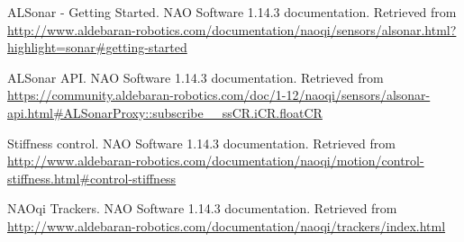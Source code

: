 \begin{thebibliography}{99}
	ALSonar - Getting Started.
	NAO Software 1.14.3 documentation.
	Retrieved from \url{http://www.aldebaran-robotics.com/documentation/naoqi/sensors/alsonar.html?highlight=sonar#getting-started}

	ALSonar API.
	NAO Software 1.14.3 documentation.
	Retrieved from \url{https://community.aldebaran-robotics.com/doc/1-12/naoqi/sensors/alsonar-api.html#ALSonarProxy::subscribe__ssCR.iCR.floatCR}

	Stiffness control.
	NAO Software 1.14.3 documentation.
	Retrieved from \url{http://www.aldebaran-robotics.com/documentation/naoqi/motion/control-stiffness.html#control-stiffness}

	NAOqi Trackers.
	NAO Software 1.14.3 documentation.
	Retrieved from \url{http://www.aldebaran-robotics.com/documentation/naoqi/trackers/index.html}
\end{thebibliography}
